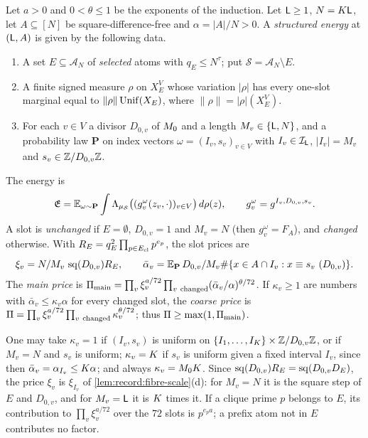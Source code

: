 \begin{definition}
\label{def:record:structured-energy}
Let $a>0$ and $0<\theta\le1$ be the exponents of the induction. Let
$\mathsf L\ge1$, $N=K\mathsf L$, let $A\subseteq[N]$ be square-difference-free and
$\alpha=|A|/N>0$. A \emph{structured energy} at $(\mathsf L,A)$ is given by the
following data.
\begin{enumerate}[label=(\alph*)]
\item A set $E\subseteq\mathcal A_N$ of \emph{selected} atoms with
 $q_E\le N^\tau$; put $\mathcal S=\mathcal A_N\setminus E$.
\item A finite signed measure $\rho$ on $X_E^V$ whose variation $|\rho|$ has
 every one-slot marginal equal to $\|\rho\|\operatorname{Unif}(X_E)$, where
 $\|\rho\|=|\rho|(X_E^V)$.
\item For each $v\in V$ a divisor $D_{0,v}$ of $M_0$ and a length
 $M_v\in\{\mathsf L,N\}$, and a probability law $\mathbf P$ on index vectors
 $\omega=(I_v,s_v)_{v\in V}$ with $I_v\in\mathcal I_\mathsf L$, $|I_v|=M_v$ and
 $s_v\in\mathbb Z/D_{0,v}\mathbb Z$.
\end{enumerate}
The energy is
\[
 \mathfrak E=\mathbb E_{\omega\sim\mathbf P}\int\Lambda_{\mu_{\mathcal S}}
 \big((g_v^\omega(z_v,\cdot))_{v\in V}\big)\,d\rho(z),\qquad
 g_v^\omega=g^{I_v,D_{0,v},s_v}.
\]
A slot is \emph{unchanged} if $E=\emptyset$, $D_{0,v}=1$ and $M_v=N$ (then
$g_v^\omega=F_A$), and \emph{changed} otherwise. With
$R_E=q_E^2\prod_{p\in E_{\rm cl}}p^{e_p}$, the slot prices are
\[
 \xi_v=N/M_v\,\operatorname{sq}(D_{0,v})R_E,\qquad
 \bar\alpha_v=\mathbb E_{\mathbf P}\,D_{0,v}/M_v\#\{x\in A\cap I_v:
 x\equiv s_v\ (D_{0,v})\}.
\]
The \emph{main price} is
$\Pi_{\rm main}=\prod_v\xi_v^{a/72}\prod_{v\ \rm changed}(\bar\alpha_v/\alpha)^{\theta/72}$.
If $\kappa_v\ge1$ are numbers with $\bar\alpha_v\le\kappa_v\alpha$ for every
changed slot, the \emph{coarse price} is
$\Pi=\prod_v\xi_v^{a/72}\prod_{v\ \rm changed}\kappa_v^{\theta/72}$; thus
$\Pi\ge\max(1,\Pi_{\rm main})$.
\end{definition}

One may take $\kappa_v=1$ if $(I_v,s_v)$ is uniform on
$\{I_1,\dots,I_K\}\times\mathbb Z/D_{0,v}\mathbb Z$, or if $M_v=N$ and $s_v$ is
uniform; $\kappa_v=K$ if $s_v$ is uniform given a fixed interval $I_v$,
since then $\bar\alpha_v=\alpha_{I_v}\le K\alpha$; and always
$\kappa_v=M_0K$. Since $\operatorname{sq}(D_{0,v})R_E=\operatorname{sq}(D_{0,v}D_E)$, the price
$\xi_v$ is $\xi_{I_v}$ of \cref{lem:record:fibre-scale}(d): for $M_v=N$ it is
the square step of $E$ and $D_{0,v}$, and for $M_v=\mathsf L$ it is $K$ times
it. If a clique prime $p$ belongs to $E$, its contribution to
$\prod_v\xi_v^{a/72}$ over the $72$ slots is $p^{e_pa}$; a prefix
atom not in $E$ contributes no factor.

